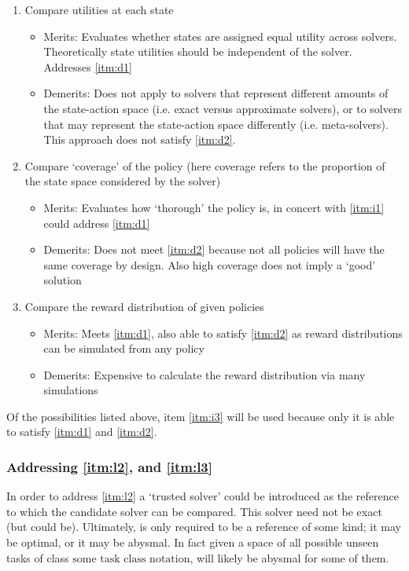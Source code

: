         \begin{enumerate}
            \item Compare utilities at each state \label{itm:i1}
            \begin{itemize}
                \item Merits: Evaluates whether states are assigned equal utility across solvers. Theoretically state utilities should be independent of the solver. Addresses \ref{itm:d1}
                \item Demerits: Does not apply to solvers that represent different amounts of the state-action space (i.e. exact versus approximate solvers), or to solvers that may represent the state-action space differently (i.e. meta-solvers). This approach does not satisfy \ref{itm:d2}.
            \end{itemize} 
            \item Compare `coverage' of the policy (here coverage refers to the proportion of the state space considered by the solver) \label{itm:i2}
            \begin{itemize}
                \item Merits: Evaluates how `thorough' the policy is, in concert with \ref{itm:i1} could address \ref{itm:d1}
                \item Demerits: Does not meet \ref{itm:d2} because not all policies will have the same coverage by design. Also high coverage does not imply a `good' solution
            \end{itemize}
            \item Compare the reward distribution of given policies \label{itm:i3}
            \begin{itemize}
                \item Merits: Meets \ref{itm:d1}, also able to satisfy \ref{itm:d2} as reward distributions can be simulated from any policy
                \item Demerits: Expensive to calculate the reward distribution via many simulations
            \end{itemize}
        \end{enumerate}

        Of the possibilities listed above, item \ref{itm:i3} will be used because only it is able to satisfy \ref{itm:d1} and \ref{itm:d2}.

    \subsubsection{Addressing \ref{itm:l2}, and \ref{itm:l3}} \label{sec:practicality}
        In order to address \ref{itm:l2} a `trusted solver' \solvestar{} could be introduced as the reference to which the candidate solver \solve{} can be compared. This solver need not be exact (but could be). Ultimately, \solvestar{} is only required to be a reference of some kind; it may be optimal, or it may be abysmal. In fact given a space of all possible unseen tasks of class $\text{some task class notation}$, \solvestar{} will likely be abysmal for some of them.

